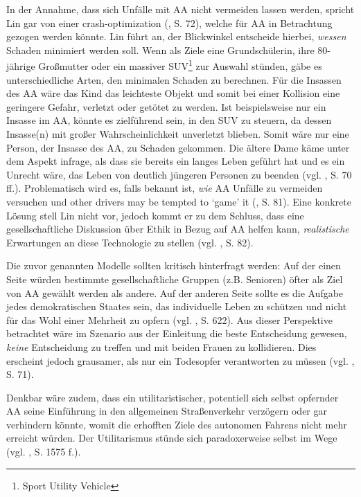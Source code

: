 \documentclass[a4paper, 12pt, titlepage]{scrartcl}
\begin{document}
	In der Annahme, dass sich Unf\"alle mit AA nicht vermeiden lassen werden, spricht Lin \autocite{Lin2015} gar von einer \glqq crash-optimization\grqq{} (\autocite{Lin2015}, S. 72), welche f\"ur AA in Betrachtung gezogen werden k\"onnte. Lin \autocite{Lin2015} f\"uhrt an, der Blickwinkel entscheide hierbei, \emph{wessen} Schaden minimiert werden soll. Wenn als \glqq Ziele\grqq{} eine Grundsch\"ulerin, ihre 80-j\"ahrige Gro\ss mutter oder ein massiver SUV\footnote{Sport Utility Vehicle} zur Auswahl st\"unden, g\"abe es unterschiedliche Arten, den minimalen Schaden zu berechnen. F\"ur die Insassen des AA w\"are das Kind das leichteste Objekt und somit bei einer Kollision eine geringere Gefahr, verletzt oder get\"otet zu werden. Ist beispielsweise nur ein Insasse im AA, k\"onnte es zielf\"uhrend sein, in den SUV zu steuern, da dessen Insasse(n) mit gro\ss er Wahrscheinlichkeit unverletzt blieben. Somit w\"are nur eine Person, der Insasse des AA, zu Schaden gekommen. Die \"altere Dame k\"ame unter dem Aspekt infrage, als dass sie bereits ein langes Leben gef\"uhrt hat und es ein Unrecht w\"are, das Leben von deutlich j\"ungeren Personen zu beenden (vgl. \autocite{Lin2015}, S. 70 ff.). Problematisch wird es, falls bekannt ist, \emph{wie} AA Unf\"alle zu vermeiden versuchen und \glqq other drivers may be tempted to `game' it\grqq{} (\autocite{Lin2015}, S. 81). Eine konkrete L\"osung stell Lin \autocite{Lin2015} nicht vor, jedoch kommt er zu dem Schluss, dass eine gesellschaftliche Diskussion \"uber Ethik in Bezug auf AA helfen kann, \emph{realistische} Erwartungen an diese Technologie zu stellen (vgl. \autocite{Lin2015}, S. 82).
	
	Die zuvor genannten Modelle sollten kritisch hinterfragt werden: Auf der einen Seite w\"urden bestimmte gesellschaftliche Gruppen (z.B. Senioren) \"ofter als \glqq Ziel\grqq{} von AA gew\"ahlt werden als andere. Auf der anderen Seite sollte es die Aufgabe jedes demokratischen Staates sein, das individuelle Leben zu sch\"utzen und nicht f\"ur das Wohl einer Mehrheit zu opfern (vgl. \autocite{Hevelke2015}, S. 622). Aus dieser Perspektive betrachtet w\"are im Szenario aus der Einleitung die beste Entscheidung gewesen, \emph{keine} Entscheidung zu treffen und mit beiden Frauen zu kollidieren. Dies erscheint jedoch grausamer, als nur ein Todesopfer verantworten zu m\"ussen (vgl. \autocite{Lin2015}, S. 71).
	
	Denkbar w\"are zudem, dass ein utilitaristischer, potentiell sich selbst opfernder AA seine Einf\"uhrung in den allgemeinen Stra\ss enverkehr verz\"ogern oder gar verhindern k\"onnte, womit die erhofften Ziele des autonomen Fahrens nicht mehr erreicht w\"urden. Der Utilitarismus st\"unde sich paradoxerweise selbst im Wege (vgl. \autocite{Bonnefon1573}, S. 1575 f.).
\end{document}

